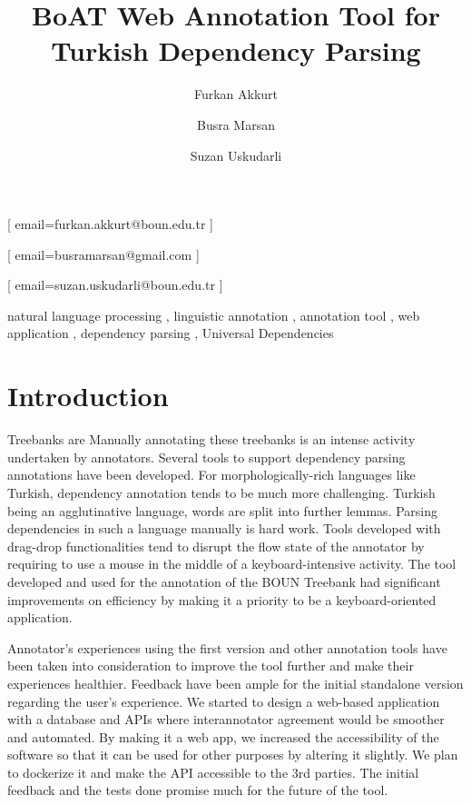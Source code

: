 \documentclass[
]{ceurart}
\begin{document}


\title{BoAT Web Annotation Tool for Turkish Dependency Parsing}

\author[]{Furkan Akkurt}[%
email=furkan.akkurt@boun.edu.tr
]

\author[]{Busra Marsan}[%
email=busramarsan@gmail.com
]

\author[]{Suzan Uskudarli}[%
email=suzan.uskudarli@boun.edu.tr
]

\address[]{ Department of Computer Engineering, Bogazici University, Bebek, 34342, İstanbul, Turkey }



\begin{keywords}
natural language processing \sep
linguistic annotation \sep
annotation tool \sep
web application \sep
dependency parsing \sep
Universal Dependencies
\end{keywords}

\maketitle

\section{Introduction}
\label{sec:introduction}
Treebanks are 
Manually annotating these treebanks is an intense activity undertaken by annotators.
Several tools to support dependency parsing annotations have been developed. %
For morphologically-rich languages like Turkish, dependency annotation tends to be much more challenging.
Turkish being an agglutinative language, words are split into further lemmas.
Parsing dependencies in such a language manually is hard work.
Tools developed with drag-drop functionalities tend to disrupt the flow state of the annotator by requiring to use a mouse in the middle of a keyboard-intensive activity.
The tool developed and used for the annotation of the BOUN Treebank had significant improvements on efficiency by making it a priority to be a keyboard-oriented application.

Annotator's experiences using the first version and other annotation tools have been taken into consideration to improve the tool further and make their experiences healthier.
Feedback have been ample for the initial standalone version regarding the user's experience.
We started to design a web-based application with a database and APIs where interannotator agreement would be smoother and automated.
By making it a web app, we increased the accessibility of the software so that it can be used for other purposes by altering it slightly.
We plan to dockerize it and make the API accessible to the 3rd parties.
The initial feedback and the tests done promise much for the future of the tool.
\end{document}
